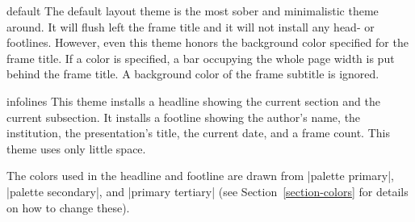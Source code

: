 \begin{outerthemeexample}{default}
  The default layout theme is the most sober and minimalistic theme around. It will flush left the frame title and it will not install any head- or footlines. However, even this theme honors the background color specified for the frame title. If a color is specified, a bar occupying the whole page width is put behind the frame title. A background color of the frame subtitle is ignored.
\end{outerthemeexample}

\begin{outerthemeexample}{infolines}
  This theme installs a headline showing the current section and the current subsection. It installs a footline showing the author's name, the institution, the presentation's title, the current date, and a frame count. This theme uses only little space.

  The colors used in the headline and footline are drawn from |palette primary|, |palette secondary|, and |primary tertiary| (see Section~\ref{section-colors} for details on how to change these).
\end{outerthemeexample}

